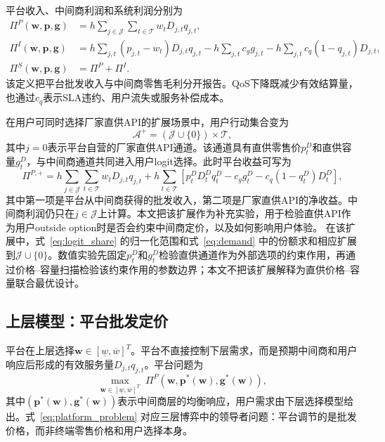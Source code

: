 \documentclass[UTF8,11pt]{ctexart}
\newcommand{\T}{\mathcal{T}}
\newcommand{\J}{\mathcal{J}}
\newcommand{\A}{\mathcal{A}}
\newcommand{\D}{D}
\newcommand{\w}{\boldsymbol{w}}
\newcommand{\p}{\boldsymbol{p}}
\newcommand{\g}{\boldsymbol{g}}
\begin{document}
平台收入、中间商利润和系统利润分别为
\begin{align}
  \Pi^P(\w,\p,\g)
  &=h\sum_{j\in\J}\sum_{t\in\T} w_t\D_{j,t}q_{j,t}, \label{eq:platform_profit}\\
  \Pi^I(\w,\p,\g)
  &=h\sum_{j,t}(p_{j,t}-w_t)\D_{j,t}q_{j,t}
    -h\sum_{j,t}c_g g_{j,t}
    -h\sum_{j,t}c_q(1-q_{j,t})\D_{j,t}, \label{eq:intermediary_profit}\\
  \Pi^S(\w,\p,\g)&=\Pi^P+\Pi^I. \label{eq:system_profit}
\end{align}
该定义把平台批发收入与中间商零售毛利分开报告。QoS下降既减少有效结算量，也通过$c_q$表示SLA违约、用户流失或服务补偿成本。

在用户可同时选择厂家直供API的扩展场景中，用户行动集合变为
\begin{equation}
  \A^+=(\J\cup\{0\})\times\T,
  \label{eq:direct_api_action_set}
\end{equation}
其中$j=0$表示平台自营的厂家直供API通道。该通道具有直供零售价$p^D_t$和直供容量$g^D_t$，与中间商通道共同进入用户logit选择。此时平台收益可写为
\begin{equation}
  \Pi^{P,+}
  =h\sum_{j\in\J}\sum_{t\in\T}w_t\D_{j,t}q_{j,t}
  +h\sum_{t\in\T}\left[
    p^D_t\D^D_tq^D_t-c_g g^D_t-c_q(1-q^D_t)\D^D_t
  \right],
  \label{eq:direct_platform_payoff}
\end{equation}
其中第一项是平台从中间商获得的批发收入，第二项是厂家直供API的净收益。中间商利润仍只在$j\in\J$上计算。本文把该扩展作为补充实验，用于检验直供API作为用户outside option时是否会约束中间商定价，以及如何影响用户体验。
在该扩展中，式~\eqref{eq:logit_share} 的归一化范围和式~\eqref{eq:demand} 中的份额求和相应扩展到$\J\cup\{0\}$。数值实验先固定$p^D_t$和$g^D_t$检验直供通道作为外部选项的约束作用，再通过价格--容量扫描检验该约束作用的参数边界；本文不把该扩展解释为直供价格--容量联合最优设计。

\subsection{上层模型：平台批发定价}
\label{sec:upper_platform}

平台在上层选择$\w\in[\underline w,\overline w]^T$。平台不直接控制下层需求，而是预期中间商和用户响应后形成的有效服务量$\D_{j,t}q_{j,t}$。平台问题为
\begin{equation}
  \max_{\w\in[\underline w,\overline w]^T}\;
  \Pi^P(\w,\p^*(\w),\g^*(\w)),
  \label{eq:platform_problem}
\end{equation}
其中$(\p^*(\w),\g^*(\w))$表示中间商层的均衡响应，用户需求由下层选择模型给出。式~\eqref{eq:platform_problem} 对应三层博弈中的领导者问题：平台调节的是批发价格，而非终端零售价格和用户选择本身。
\end{document}

